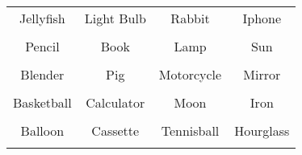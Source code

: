 \documentclass[12pt,a4paper]{article}
\begin{document}
\thispagestyle{empty}
\begin{table}[]
\centering
\Huge
\begin{tabular}{cccc}
 Jellyfish& Light Bulb& Rabbit& Iphone\\  & & & \\
 Pencil& Book& Lamp& Sun\\  & & & \\
 Blender& Pig& Motorcycle& Mirror\\  & & & \\
 Basketball& Calculator& Moon& Iron\\  & & & \\
 Balloon& Cassette& Tennisball& Hourglass\\  & & & \\
\end{tabular}
\end{table}
\end{document}
